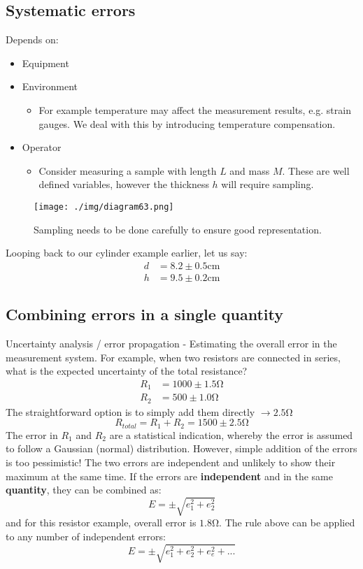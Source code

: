 \subsection{Systematic errors}
Depends on:
\begin{itemize}
  \item Equipment
  \item Environment
        \begin{itemize}
          \item For example temperature may affect the measurement results, e.g. strain gauges. We deal with this by introducing temperature compensation.
        \end{itemize}
  \item Operator
        \begin{itemize}
          \item Consider measuring a sample with length $L$ and mass $M$. These are well defined variables, however the thickness $h$ will require sampling.
        \end{itemize}
\end{itemize}
\begin{figure}[H]
  \centering
  \texttt{[image: ./img/diagram63.png]}
  \caption{Sampling needs to be done carefully to ensure good representation.}
\end{figure}
Looping back to our cylinder example earlier, let us say:
\begin{align}
  d & = 8.2 \pm 0.5 \si{\centi\meter} \\
  h & = 9.5 \pm 0.2 \si{\centi\meter}
\end{align}
\subsection{Combining errors in a single quantity}
Uncertainty analysis / error propagation - Estimating the overall error in the measurement system. For example, when two resistors are connected in series, what is the expected uncertainty of the total resistance?
\begin{align}
  R_1 & = 1000 \pm 1.5 \si{\ohm} \\
  R_2 & = 500 \pm 1.0 \si{\ohm}
\end{align}
The straightforward option is to simply add them directly $\rightarrow 2.5\si{\ohm}$
\begin{equation}
  R_{total} = R_1 + R_2 = 1500 \pm 2.5 \si{\ohm}
\end{equation}
The error in $R_1$ and $R_2$ are a statistical indication, whereby the error is assumed to follow a Gaussian (normal) distribution. However, simple addition of the errors is too pessimistic! The two errors are independent and unlikely to show their maximum at the same time. If the errors are \textbf{independent} and in the same \textbf{quantity}, they can be combined as:
\begin{equation}
  E = \pm \sqrt{e_1^2 + e_2^2}
\end{equation}
and for this resistor example, overall error is $1.8 \si{\ohm}$. The rule above can be applied to any number of independent errors:
\begin{equation}
  E = \pm \sqrt{e_1^2 + e_2^2 + e_e^2 + ...}
\end{equation}
